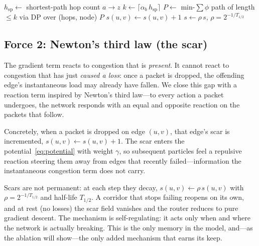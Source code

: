 \begin{algorithm}[t]
\caption{EMMET-core routing step (two-term physical router)}
\label{alg:core}
\SetAlgoLined
{}
$h_{\text{sp}} \leftarrow$ shortest-path hop count $a \to z$\;
$k \leftarrow \lceil \alpha_b \, h_{\text{sp}} \rceil$
$P \leftarrow$ min-$\sum\phi$ path of length $\le k$ via DP over (hops, node)
\Return $P$\;
\BlankLine
{}
$s(u,v) \leftarrow s(u,v) + 1$
$s \leftarrow \rho\, s$, \quad $\rho = 2^{-1/T_{1/2}}$
\end{algorithm}


\subsection{Force 2: Newton's third law (the scar)}

The gradient term reacts to congestion that is \emph{present}. It cannot
react to congestion that has just \emph{caused a loss}: once a packet is
dropped, the offending edge's instantaneous load may already have fallen.
We close this gap with a reaction term inspired by Newton's third law---to
every action a packet undergoes, the network responds with an equal and
opposite reaction on the packets that follow.

Concretely, when a packet is dropped on edge $(u,v)$, that edge's scar is
incremented, $s(u,v) \leftarrow s(u,v) + 1$. The scar enters the
potential~\eqref{eq:potential} with weight $\gamma$, so subsequent particles
feel a repulsive reaction steering them away from edges that recently
failed---information the instantaneous congestion term does not carry.

Scars are not permanent: at each step they decay,
$s(u,v) \leftarrow \rho\, s(u,v)$ with $\rho = 2^{-1/T_{1/2}}$ and half-life
$T_{1/2}$. A corridor that stops failing reopens on its own, and at rest
(no losses) the scar field vanishes and the router reduces to pure gradient
descent. The mechanism is self-regulating: it acts only when and where the
network is actually breaking. This is the only memory in the model, and---as
the ablation will show---the only added mechanism that earns its keep.

